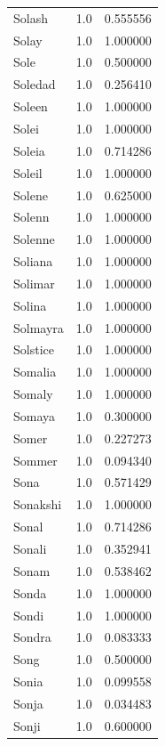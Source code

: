 \documentclass[
  letterpaper,
  DIV=11,
  numbers=noendperiod]{scrreprt}
\begin{document}
\begin{tabular}{lrr}
Solash          &   1.0 &   0.555556 \\
Solay           &   1.0 &   1.000000 \\
Sole            &   1.0 &   0.500000 \\
Soledad         &   1.0 &   0.256410 \\
Soleen          &   1.0 &   1.000000 \\
Solei           &   1.0 &   1.000000 \\
Soleia          &   1.0 &   0.714286 \\
Soleil          &   1.0 &   1.000000 \\
Solene          &   1.0 &   0.625000 \\
Solenn          &   1.0 &   1.000000 \\
Solenne         &   1.0 &   1.000000 \\
Soliana         &   1.0 &   1.000000 \\
Solimar         &   1.0 &   1.000000 \\
Solina          &   1.0 &   1.000000 \\
Solmayra        &   1.0 &   1.000000 \\
Solstice        &   1.0 &   1.000000 \\
Somalia         &   1.0 &   1.000000 \\
Somaly          &   1.0 &   1.000000 \\
Somaya          &   1.0 &   0.300000 \\
Somer           &   1.0 &   0.227273 \\
Sommer          &   1.0 &   0.094340 \\
Sona            &   1.0 &   0.571429 \\
Sonakshi        &   1.0 &   1.000000 \\
Sonal           &   1.0 &   0.714286 \\
Sonali          &   1.0 &   0.352941 \\
Sonam           &   1.0 &   0.538462 \\
Sonda           &   1.0 &   1.000000 \\
Sondi           &   1.0 &   1.000000 \\
Sondra          &   1.0 &   0.083333 \\
Song            &   1.0 &   0.500000 \\
Sonia           &   1.0 &   0.099558 \\
Sonja           &   1.0 &   0.034483 \\
Sonji           &   1.0 &   0.600000 \\

\end{tabular}
\end{document}
